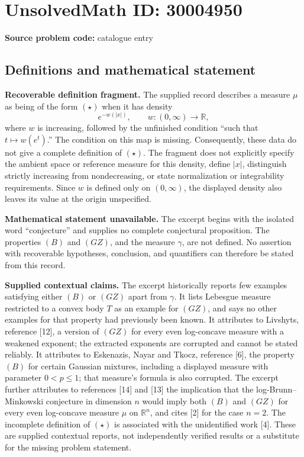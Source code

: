 \documentclass[11pt]{article}
\newcommand{\R}{\mathbb{R}}
\begin{document}
\section*{UnsolvedMath ID: 30004950}
\textbf{Source problem code:} catalogue entry
\subsection{Definitions and mathematical statement}
\textbf{Recoverable definition fragment.} The supplied record describes a measure \(\mu\) as being of the form \((\star)\) when it has density
\[
 e^{-w(|x|)},\qquad w:(0,\infty)\longrightarrow\R,
\]
where \(w\) is increasing, followed by the unfinished condition ``such that \(t\mapsto w(e^t)\).'' The condition on this map is missing. Consequently, these data do not give a complete definition of \((\star)\). The fragment does not explicitly specify the ambient space or reference measure for this density, define \(|x|\), distinguish strictly increasing from nondecreasing, or state normalization or integrability requirements. Since \(w\) is defined only on \((0,\infty)\), the displayed density also leaves its value at the origin unspecified.

\textbf{Mathematical statement unavailable.} The excerpt begins with the isolated word ``conjecture'' and supplies no complete conjectural proposition. The properties \((B)\) and \((GZ)\), and the measure \(\gamma\), are not defined. No assertion with recoverable hypotheses, conclusion, and quantifiers can therefore be stated from this record.

\textbf{Supplied contextual claims.} The excerpt historically reports few examples satisfying either \((B)\) or \((GZ)\) apart from \(\gamma\). It lists Lebesgue measure restricted to a convex body \(T\) as an example for \((GZ)\), and says no other examples for that property had previously been known. It attributes to Livshyts, reference [12], a version of \((GZ)\) for every even log-concave measure with a weakened exponent; the extracted exponents are corrupted and cannot be stated reliably. It attributes to Eskenazis, Nayar and Tkocz, reference [6], the property \((B)\) for certain Gaussian mixtures, including a displayed measure with parameter \(0<p\leq1\); that measure's formula is also corrupted. The excerpt further attributes to references [14] and [13] the implication that the log-Brunn--Minkowski conjecture in dimension \(n\) would imply both \((B)\) and \((GZ)\) for every even log-concave measure \(\mu\) on \(\R^n\), and cites [2] for the case \(n=2\). The incomplete definition of \((\star)\) is associated with the unidentified work [4]. These are supplied contextual reports, not independently verified results or a substitute for the missing problem statement.
\end{document}
